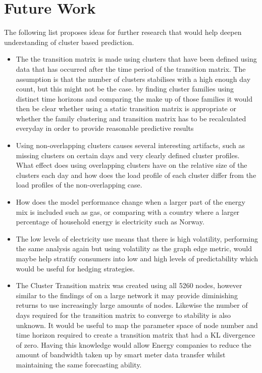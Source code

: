 \section{Future Work}

The following list proposes ideas for further research that would help deepen understanding of cluster based prediction.

\begin{itemize}
    \item The the transition matrix is made using clusters that have been defined using data that has occurred after the time period of the transition matrix. The assumption is that the number of clusters stabilises with a high enough day count, but this might not be the case. by finding cluster families using distinct time horizons and comparing the make up of those families it would then be clear whether using a static transition matrix is appropriate or whether the family clustering and transition matrix has to be recalculated everyday in order to provide reasonable predictive results
    
    \item Using non-overlapping clusters causes several interesting artifacts, such as missing clusters on certain days and very clearly defined cluster profiles. What effect does using overlapping clusters have on the relative size of the clusters each day and how does the load profile of each cluster differ from the load profiles of the non-overlapping case.
    
    \item How does the model performance change when a larger part of the energy mix is included such as gas, or comparing with a country where a larger percentage of household energy is electricity such as Norway.

    \item The low levels of electricity use means that there is high volatility, performing the same analysis again but using volatility as the graph edge metric, would maybe help stratify consumers into low and high levels of predictability which would be useful for hedging strategies.
    
    \item The Cluster Transition matrix was created using all 5260 nodes, however similar to the findings of \cite{kavousian2013} on a large network it may provide diminishing returns to use increasingly large amounts of nodes. Likewise the number of days required for the transition matrix to converge to stability is also unknown. It would be useful to map the parameter space of node number and time horizon required to create a transition matrix that had a KL divergence of zero. Having this knowledge would allow Energy companies to reduce the amount of bandwidth taken up by smart meter data transfer whilst maintaining the same forecasting ability.
    

\end{itemize}

